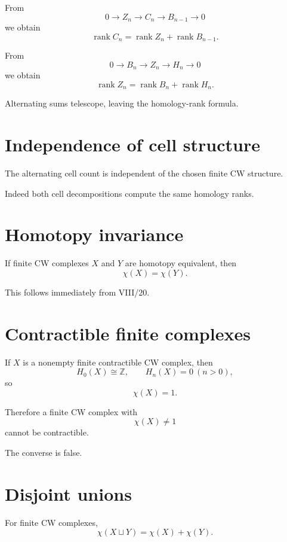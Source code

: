 From
\[
0\to Z_n\to C_n\to B_{n-1}\to0
\]
we obtain
\[
\operatorname{rank}C_n
=
\operatorname{rank}Z_n+\operatorname{rank}B_{n-1}.
\]

From
\[
0\to B_n\to Z_n\to H_n\to0
\]
we obtain
\[
\operatorname{rank}Z_n
=
\operatorname{rank}B_n+\operatorname{rank}H_n.
\]

Alternating sums telescope, leaving the homology-rank formula.

\section{Independence of cell structure}

\begin{corollary}
\label{cor:viii21-well-defined}
The alternating cell count is independent of the chosen finite CW structure.
\end{corollary}

Indeed both cell decompositions compute the same homology ranks.

\section{Homotopy invariance}

\begin{corollary}
\label{cor:viii21-homotopy}
If finite CW complexes \(X\) and \(Y\) are homotopy equivalent, then
\[
\chi(X)=\chi(Y).
\]
\end{corollary}

This follows immediately from VIII/20.

\section{Contractible finite complexes}

If \(X\) is a nonempty finite contractible CW complex, then
\[
H_0(X)\cong\mathbb Z,
\qquad
H_n(X)=0\ (n>0),
\]
so
\[
\chi(X)=1.
\]

Therefore a finite CW complex with
\[
\chi(X)\ne1
\]
cannot be contractible.

The converse is false.

\section{Disjoint unions}

For finite CW complexes,
\[
\chi(X\sqcup Y)=\chi(X)+\chi(Y).
\]

